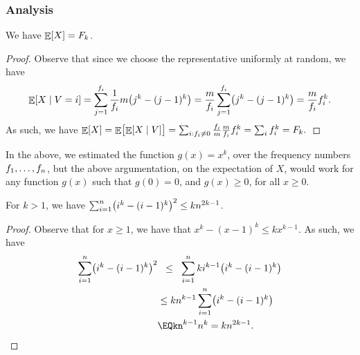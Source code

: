 \subsubsection{Analysis}




\begin{lemma}
    We have $\mathop{\mathbb{E}}\!\left[ {X} \right]=F_k$.
\end{lemma}
\begin{proof}
    Observe that since we choose the representative uniformly at
    random, we have
    \begin{equation*}
        \ExCond{X}{V=i}
        =%
        \sum_{j=1}^{\frq_i}\frac{1}{\frq_i} m \bigl( j^k - (j-1)^k \bigr)
        =%
        \frac{m}{\frq_i}\sum_{j=1}^{\frq_i}
        \bigl( j^k - (j-1)^k \bigr)
        =%
        \frac{m}{\frq_i} \frq_i^{k}.
    \end{equation*}
    As such, we have
    \begin{math}
        \Ex{X}%
        =%
        \Ex{\bigl.\ExCond{X}{V}} %
        =%
        \sum_{i: \frq_i\neq 0} \frac{\frq_i}{m} \frac{m}{\frq_i}
        \frq_i^{k} %
        =%
        \sum_{i} \frq_i^{k} %
        =%
        \Frq_k.
    \end{math}
\end{proof}


\begin{remark}
    In the above, we estimated the function $g(x)=x^k$, over the
    frequency numbers $f_1, \ldots, f_n$, but the above
    argumentation, on the expectation of $X$, would work for any function
    $g(x)$ such that $g(0)=0$, and $g(x) \geq 0$, for all $x \geq 0$.
\end{remark}


\begin{lemma}
    For $k > 1$, we have
    $\sum_{i=1}^n \pth{ i^k - (i-1)^k}^2 \leq kn^{2k-1}$.
\end{lemma}
\begin{proof}
    Observe that for $x\geq 1$, we have that
    $x^k - (x-1)^k \leq kx^{k-1}$. As such, we have
    \begin{align*}
        \sum_{i=1}^n \pth{ i^k - (i-1)^k}^2%
        &\LEQ %
        \sum_{i=1}^n  ki^{k-1}\pth{ i^k - (i-1)^k}%
        \\&\leq %
        kn^{k-1} \sum_{i=1}^n \pth{ i^k - (i-1)^k}%
        \\&
        \EQ%
        kn^{k-1} n^{k}
        =%
        kn^{2k-1}.
    \end{align*}
\end{proof}


